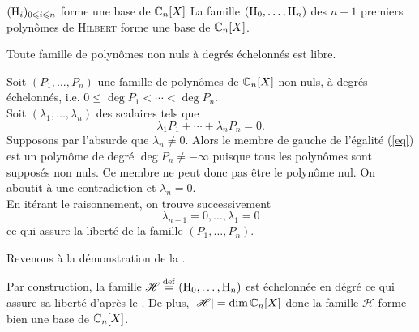 \begin{prop}{$(\mathrm{H}_i)_{0 \leqslant i \leqslant n}$ forme une base de $\mathbb{C}_n[X]$} 
    La famille $(\mathrm{H}_0, \dots, \mathrm{H}_n)$ des $n+1$ premiers polynômes de \textsc{Hilbert} forme une base de $\mathbb{C}_n[X]$.
\end{prop}

\begin{lemme} 
    Toute famille de polynômes non nuls à degrés échelonnés est libre.
\end{lemme}

\begin{preuve}
    Soit $(P_1, \dots, P_n)$ une famille de polynômes de $\mathbb{C}_n[X]$ non nuls, à degrés échelonnés, i.e. $0 \leqslant \deg P_1 < \cdots < \deg P_n$. \\
    Soit $(\lambda_1, \dots, \lambda_n)$ des scalaires tels que
    \begin{equation}\tag{$\star$} \label{eq}
        \lambda_1 P_1 + \cdots + \lambda_n P_n = 0.
    \end{equation}
    Supposons par l'absurde que $\lambda_n \not= 0$. Alors le membre de gauche de l'égalité (\ref{eq}) est un polynôme de degré $\deg P_n \not= - \infty$ puisque tous les polynômes sont supposés non nuls. Ce membre ne peut donc pas être le polynôme nul. On aboutit à une contradiction et $\lambda_n = 0$. \\ 
    En itérant le raisonnement, on trouve successivement 
    $$\lambda_{n-1} = 0, \dots, \lambda_1 = 0$$
    ce qui assure la liberté de la famille $(P_1, \dots, P_n)$.
\end{preuve}


Revenons à la démonstration de la .

\begin{preuve}
    Par construction, la famille $\mathscr{H} \overset{\mathrm{\tiny def}}{=} (\mathrm{H}_0, \dots, \mathrm{H}_n)$ est échelonnée en dégré \note ce qui assure sa liberté d'après le . De plus, $|\mathscr{H}| = \dim \mathbb{C}_n[X]$ donc la famille $\mathscr{H}$ forme bien une base de $\mathbb{C}_n[X]$.
\end{preuve}